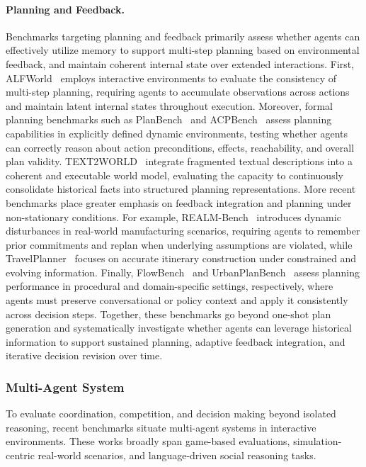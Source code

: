 \paragraph{Planning and Feedback.} Benchmarks targeting planning and feedback primarily assess whether agents can effectively utilize memory to support multi-step planning based on environmental feedback, and maintain coherent internal state over extended interactions. First, ALFWorld~\cite{shridhar2020alfworld} employs interactive environments to evaluate the consistency of multi-step planning, requiring agents to accumulate observations across actions and maintain latent internal states throughout execution. Moreover, formal planning benchmarks such as PlanBench~\cite{valmeekam2023planbench} and ACPBench~\cite{kokel2025acpbench} assess planning capabilities in explicitly defined dynamic environments, testing whether agents can correctly reason about action preconditions, effects, reachability, and overall plan validity. TEXT2WORLD~\cite{hu2025text2world} integrate fragmented textual descriptions into a coherent and executable world model, evaluating the capacity to continuously consolidate historical facts into structured planning representations.
More recent benchmarks place greater emphasis on feedback integration and planning under non-stationary conditions. For example, REALM-Bench~\cite{geng2025realm} introduces dynamic disturbances in real-world manufacturing scenarios, requiring agents to remember prior commitments and replan when underlying assumptions are violated, while TravelPlanner~\cite{xie2024travelplanner} focuses on accurate itinerary construction under constrained and evolving information. Finally, FlowBench~\cite{xiao2024flowbench} and UrbanPlanBench~\cite{zheng2025urbanplanbench} assess planning performance in procedural and domain-specific settings, respectively, where agents must preserve conversational or policy context and apply it consistently across decision steps. Together, these benchmarks go beyond one-shot plan generation and systematically investigate whether agents can leverage historical information to support sustained planning, adaptive feedback integration, and iterative decision revision over time.


\subsubsection{Multi-Agent System}

To evaluate coordination, competition, and decision making beyond isolated reasoning, recent benchmarks situate multi-agent systems in interactive environments. These works broadly span game-based evaluations, simulation-centric real-world scenarios, and language-driven social reasoning tasks.

